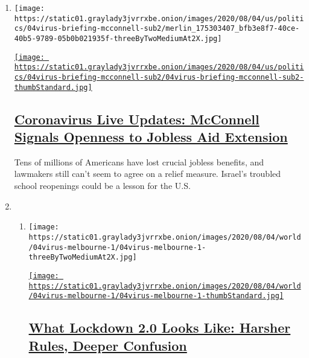 \begin{enumerate}
\def\labelenumi{\arabic{enumi}.}
\item
  \texttt{[image: https://static01.graylady3jvrrxbe.onion/images/2020/08/04/us/politics/04virus-briefing-mcconnell-sub2/merlin\_175303407\_bfb3e8f7-40ce-40b5-9789-05b0b021935f-threeByTwoMediumAt2X.jpg]}

  \href{/2020/08/04/world/coronavirus-cases.html}{\texttt{[image: https://static01.graylady3jvrrxbe.onion/images/2020/08/04/us/politics/04virus-briefing-mcconnell-sub2/04virus-briefing-mcconnell-sub2-thumbStandard.jpg]}}

  \hypertarget{coronavirus-live-updates-mcconnell-signals-openness-to-jobless-aid-extension}{%
  \subsection{\texorpdfstring{\href{/2020/08/04/world/coronavirus-cases.html}{Coronavirus
  Live Updates: McConnell Signals Openness to Jobless Aid
  Extension}}{Coronavirus Live Updates: McConnell Signals Openness to Jobless Aid Extension}}\label{coronavirus-live-updates-mcconnell-signals-openness-to-jobless-aid-extension}}

  Tens of millions of Americans have lost crucial jobless benefits, and
  lawmakers still can't seem to agree on a relief measure. Israel's
  troubled school reopenings could be a lesson for the U.S.
\item
  \begin{enumerate}
  \def\labelenumii{\arabic{enumii}.}
  \item
    \texttt{[image: https://static01.graylady3jvrrxbe.onion/images/2020/08/04/world/04virus-melbourne-1/04virus-melbourne-1-threeByTwoMediumAt2X.jpg]}

    \href{/2020/08/04/world/australia/coronavirus-melbourne-lockdown.html}{\texttt{[image: https://static01.graylady3jvrrxbe.onion/images/2020/08/04/world/04virus-melbourne-1/04virus-melbourne-1-thumbStandard.jpg]}}

    \hypertarget{what-lockdown-20-looks-like-harsher-rules-deeper-confusion}{%
    \subsection{\texorpdfstring{\href{/2020/08/04/world/australia/coronavirus-melbourne-lockdown.html}{What
    Lockdown 2.0 Looks Like: Harsher Rules, Deeper
    Confusion}}{What Lockdown 2.0 Looks Like: Harsher Rules, Deeper Confusion}}\label{what-lockdown-20-looks-like-harsher-rules-deeper-confusion}}


\end{enumerate}
\end{enumerate}
